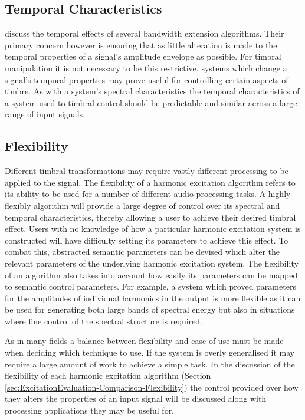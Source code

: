 	\subsection{Temporal Characteristics}
	\label{sec:ExcitationEvaluation-Evaluation-TemporalCharacteristics}		
		\citet{larsen2004audio} discuss the temporal effects of several bandwidth extension algorithms. Their
		primary concern however is ensuring that as little alteration is made to the temporal properties of a
		signal's amplitude envelope as possible. For timbral manipulation it is not necessary to be this
		restrictive, systems which change a signal's temporal properties may prove useful for controlling certain
		aspects of timbre. As with a system's spectral characteristics the temporal characteristics of a system used
		to timbral control should be predictable and similar across a large range of input signals.

	\subsection{Flexibility}
	\label{sec:ExcitationEvaluation-Evaluation-Flexibility}
		Different timbral transformations may require vastly different processing to be applied to the signal. The
		flexibility of a harmonic excitation algorithm refers to its ability to be used for a number of different
		audio processing tasks. A highly flexibly algorithm will provide a large degree of control over its spectral
		and temporal characteristics, thereby allowing a user to achieve their desired timbral effect. Users with no
		knowledge of how a particular harmonic excitation system is constructed will have difficulty setting its
		parameters to achieve this effect. To combat this, abstracted semantic parameters can be devised which alter
		the relevant parameters of the underlying harmonic excitation system. The flexibility of an algorithm also
		takes into account how easily its parameters can be mapped to semantic control parameters. For example, a
		system which proved parameters for the amplitudes of individual harmonics in the output is more flexible as
		it can be used for generating both large bands of spectral energy but also in situations where fine control
		of the spectral structure is required. 

		As in many fields a balance between flexibility and ease of use must be made when deciding which technique
		to use. If the system is overly generalised it may require a large amount of work to achieve a simple task.
		In the discussion of the flexibility of each harmonic excitation algorithm (Section
		\ref{sec:ExcitationEvaluation-Comparison-Flexibility}) the control provided over how they alters the
		properties of an input signal will be discussed along with processing applications they may be useful for.

